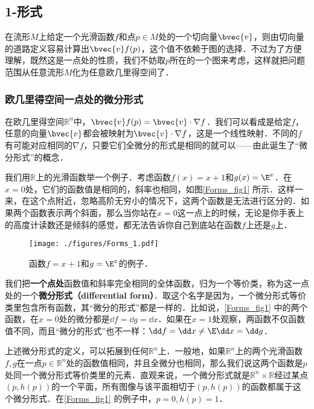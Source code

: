 

\subsection{1-形式}

在流形$M$上给定一个光滑函数$f$和点$p\in M$处的一个切向量$\bvec{v}$，则由切向量的道路定义容易计算出$\bvec{v}f(p)$，这个值不依赖于图的选择．不过为了方便理解，既然这是一点处的性质，我们不妨取$p$所在的一个图来考虑，这样就把问题范围从任意流形$M$化为任意欧几里得空间了．

\subsubsection{欧几里得空间一点处的微分形式}



在欧几里得空间$\mathbb{R}^n$中，$\bvec{v}f(p)=\bvec{v}\cdot\nabla f$．我们可以看成是给定$f$，任意的向量$\bvec{v}$都会被映射为$\bvec{v}\cdot\nabla f$，这是一个线性映射．不同的$f$有可能对应相同的$\nabla f$，只要它们全微分的形式是相同的就可以——由此诞生了“微分形式”的概念．

我们用$\mathbb{R}$上的光滑函数举一个例子．考虑函数$f(x)=x+1$和$g(x)=\E^x$．在$x=0$处，它们的函数值是相同的，斜率也相同，如图\autoref{Forms_fig1} 所示．这样一来，在这个点附近，忽略高阶无穷小的情况下，这两个函数是无法进行区分的．如果两个函数表示两个斜面，那么当你站在$x=0$这一点上的时候，无论是你手表上的高度计读数还是倾斜的感觉，都无法告诉你自己到底站在函数$f$上还是$g$上．

\begin{figure}[ht]
\centering
\texttt{[image: ./figures/Forms\_1.pdf]}
\caption{函数$f=x+1$和$g=\E^x$的例子．} \label{Forms_fig1}
\end{figure}

我们把\textbf{一个点处}函数值和斜率完全相同的全体函数，归为一个等价类，称为这一点处的一个\textbf{微分形式（differential form）}．取这个名字是因为，一个微分形式等价类里包含所有函数，其“微分的形式”都是一样的．比如说，\autoref{Forms_fig1} 中的两个函数，在$x=0$处的微分都是$\dd f=\dd g=\dd x$．如果在$x=1$处观察，两函数不仅函数值不同，而且“微分的形式”也不一样：$\dd f=\dd x\not=\E\dd x=\dd g$．

上述微分形式的定义，可以拓展到任何$\mathbb{R}^n$上．一般地，如果$\mathbb{R}^n$上的两个光滑函数$f, g$在一点$p\in\mathbb{R}^n$处的函数值相同，并且全微分也相同，那么我们说这两个函数是$p$处同一个微分形式等价类里的元素．直观来说，一个微分形式就是$\mathbb{R}^n\times\mathbb{R}$经过某点$(p, h(p))$的一个平面，所有图像与该平面相切于$(p, h(p))$的函数都属于这个微分形式．在\autoref{Forms_fig1} 的例子中，$p=0, h(p)=1$．


